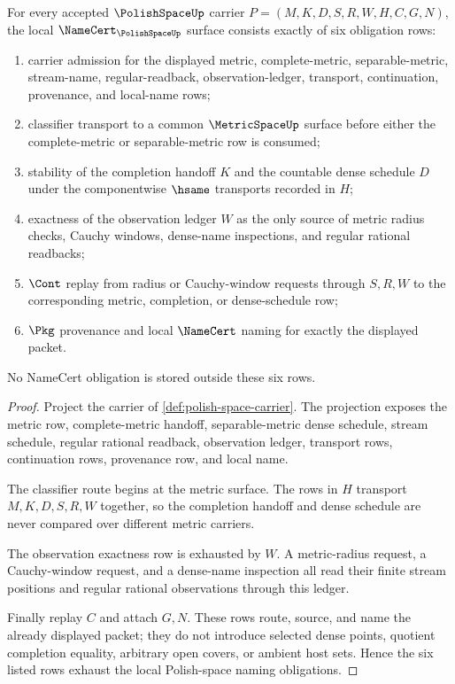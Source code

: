 \begin{theorem}
\label{thm:polish-space-namecert-obligations}
For every accepted $\PolishSpaceUp$ carrier
$P=(M,K,D,S,R,W,H,C,G,N)$, the local $\NameCert_{\PolishSpaceUp}$ surface
consists exactly of six obligation rows:
\begin{enumerate}
\item carrier admission for the displayed metric, complete-metric,
separable-metric, stream-name, regular-readback, observation-ledger,
transport, continuation, provenance, and local-name rows;
\item classifier transport to a common $\MetricSpaceUp$ surface before either
the complete-metric or separable-metric row is consumed;
\item stability of the completion handoff $K$ and the countable dense schedule
$D$ under the componentwise $\hsame$ transports recorded in $H$;
\item exactness of the observation ledger $W$ as the only source of metric
radius checks, Cauchy windows, dense-name inspections, and regular rational
readbacks;
\item $\Cont$ replay from radius or Cauchy-window requests through $S,R,W$ to
the corresponding metric, completion, or dense-schedule row;
\item $\Pkg$ provenance and local $\NameCert$ naming for exactly the displayed
packet.
\end{enumerate}
No NameCert obligation is stored outside these six rows.
\end{theorem}
\begin{proof}
Project the carrier of \autoref{def:polish-space-carrier}. The projection
exposes the metric row, complete-metric handoff, separable-metric dense
schedule, stream schedule, regular rational readback, observation ledger,
transport rows, continuation rows, provenance row, and local name.

The classifier route begins at the metric surface. The rows in $H$ transport
$M,K,D,S,R,W$ together, so the completion handoff and dense schedule are never
compared over different metric carriers.

The observation exactness row is exhausted by $W$. A metric-radius request, a
Cauchy-window request, and a dense-name inspection all read their finite
stream positions and regular rational observations through this ledger.

Finally replay $C$ and attach $G,N$. These rows route, source, and name the
already displayed packet; they do not introduce selected dense points,
quotient completion equality, arbitrary open covers, or ambient host sets.
Hence the six listed rows exhaust the local Polish-space naming obligations.
\end{proof}

